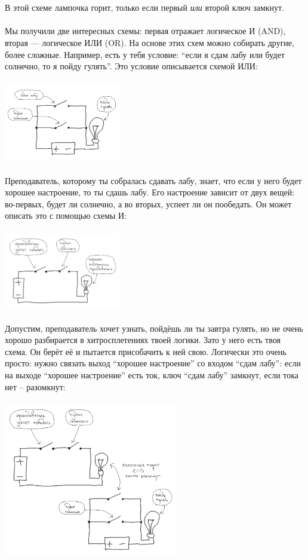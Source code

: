 \documentclass[11pt]{book}
\begin{document}
\\ \\
В этой схеме лампочка горит, только если первый \emph{или} второй ключ замкнут.
\\ \\
Мы получили две интересных схемы: первая отражает логическое И (AND), вторая ---
логическое ИЛИ (OR). На основе этих схем можно собирать другие, более сложные.
Например, есть у тебя условие: ``если я сдам лабу или будет солнечно,
то я пойду гулять''. Это условие описывается схемой ИЛИ:
\\ \\
\includegraphics[width=2in]{pic/8.png}
\\ \\
Преподаватель, которому ты собралась сдавать лабу, знает, что если у него
будет хорошее настроение, то ты сдашь лабу. Его настроение зависит от двух вещей:
во-первых, будет ли солнечно, а во вторых, успеет ли он пообедать.
Он может описать это с помощью схемы И:
\\ \\
\includegraphics[width=2in]{pic/9.png}
\\ \\
Допустим, преподаватель хочет узнать, пойдёшь ли ты завтра гулять, но не очень
хорошо разбирается в хитросплетениях твоей логики. Зато у него есть твоя схема.
Он берёт её и пытается присобачить к ней свою. Логически это очень просто:
нужно связать выход ``хорошее настроение'' со входом ``сдам лабу'': если на выходе
``хорошее настроение'' есть ток, ключ ``сдам лабу'' замкнут, если тока нет --
разомкнут:
\\ \\
\includegraphics[width=3in]{pic/10.png}
\end{document}
